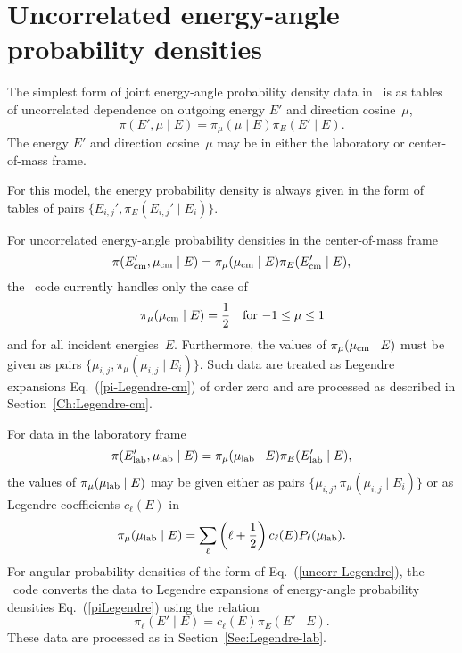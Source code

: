\chapter{Uncorrelated energy-angle probability densities}
\label{Sec:uncorrelated-lab}
The simplest form of joint energy-angle probability density data in
\xendl\ is as tables of uncorrelated dependence on outgoing energy
$E'$ and direction cosine~$\mu$,
\begin{equation}
  \pi(E', \mu   \mid E) =
  \pi_\mu(\mu   \mid E)\pi_E(E'   \mid E).
   \label{uncorrelated}
\end{equation}
The energy $E'$ and direction cosine~$\mu$ may be in either
the laboratory or center-of-mass frame.

For this model, the energy probability density is always given
in the form of tables of pairs $\{E_{i,j}', \pi_E(E_{i,j}' \mid E_i)\}$.

For uncorrelated energy-angle probability densities
in the center-of-mass frame
\begin{equation*}
 \pi(E_{\text{cm}}'  , \mu_{\text{cm}}   \mid E) =
  \pi_\mu(\mu_{\text{cm}}   \mid E)\pi_E(E_{\text{cm}}'   \mid E),
\end{equation*}
the \gettransfer\ code currently
handles only the case of
$$
 \pi_\mu(\mu_{\text{cm}}   \mid E) = \frac{1}{2}
 \quad \text{for $-1\le \mu \le 1$}
$$
and for all incident energies~$E$.  Furthermore, the values
of $\pi_\mu(\mu_{\text{cm}}   \mid E)$ must be given as pairs
$\{\mu_{i,j}, \pi_\mu(\mu_{i,j} \mid E_i)\}$.
Such data are treated as
Legendre expansions Eq.~(\ref{pi-Legendre-cm}) of order zero and 
are processed as described in Section~\ref{Ch:Legendre-cm}.

For data in the laboratory frame
\begin{equation}
  \pi(E_{\text{lab}}'  , \mu_{\text{lab}}   \mid E) =
  \pi_\mu(\mu_{\text{lab}}   \mid E)\pi_E(E_{\text{lab}}'   \mid E),
   \label{uncorrelated-lab}
\end{equation}
the values of $\pi_\mu(\mu_{\text{lab}}   \mid E)$
may be given either as pairs $\{\mu_{i,j}, \pi_\mu(\mu_{i,j} \mid E_i)\}$
or as Legendre coefficients $c_\ell(E)$ in
\begin{equation}
  \pi_\mu( \mu_{\text{lab}} \mid  E) =
  \sum_\ell 
  \left(
     \ell + \frac{1}{2}
  \right)
    c_\ell(E)P_\ell( \mu_{\text{lab}} ).
  \label{uncorr-Legendre}
\end{equation}
For angular probability densities of the form of Eq.~(\ref{uncorr-Legendre}), the
\gettransfer\ code converts the data to Legendre expansions of
energy-angle probability densities Eq.~(\ref{piLegendre}) using the relation
$$
  \pi_\ell( E' \mid E) = c_\ell(E) \pi_E(E'   \mid E).
$$
These data are processed as in Section~\ref{Sec:Legendre-lab}.

